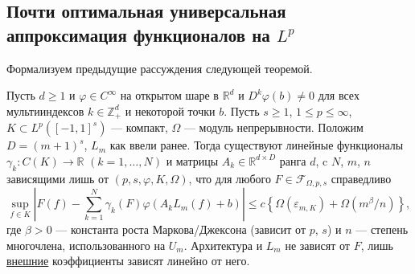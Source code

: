 \documentclass[../NDCNNAI_main.tex]{subfiles}
\begin{document}
\subsection{Почти оптимальная универсальная аппроксимация функционалов на $L^p$}
Формализуем предыдущие рассуждения следующей теоремой.
\begin{theorem}
  Пусть $d \ge 1$ и $\varphi \in C^\infty$ на открытом шаре в $\mathbb{R}^d$ и $D^k \varphi(b) \neq 0$ для всех мультииндексов $k \in \mathbb{Z}_+^d$ и некоторой точки $b$.
  Пусть $s \ge 1$, $1 \le p \le \infty$, $K \subset L^p([-1,1]^s)$ --- компакт, $\Omega$ --- модуль непрерывности.
  Положим $D = (m+1)^s$, $L_m$ как ввели ранее.
  Тогда существуют линейные функционалы $\gamma_k\colon C(K) \to \mathbb{R}$ $(k = 1,\dots,N)$ и матрицы $A_k \in \mathbb{R}^{d \times D}$ ранга $d$, c $N$, $m$, $n$ зависящими лишь от $(p,s,\varphi,K,\Omega)$, что для любого $F \in \mathcal{F}_{\Omega,p,s}$ справедливо
  $$\sup_{f \in K} \left| F(f) - \sum_{k=1}^{N} \gamma_k(F) \varphi(A_k L_m(f) + b) \right| \leq c \left\{ \Omega(\varepsilon_{m,K}) + \Omega(m^\beta / n) \right\},$$
  где $\beta > 0$ --- константа роста Маркова/Джексона (зависит от $p$, $s$) и $n$ --- степень многочлена, использованного на $U_m$.
  Архитектура и $L_m$ не зависят от $F$, лишь \underline{внешние} коэффициенты зависят линейно от него.
\end{theorem}
\end{document}

